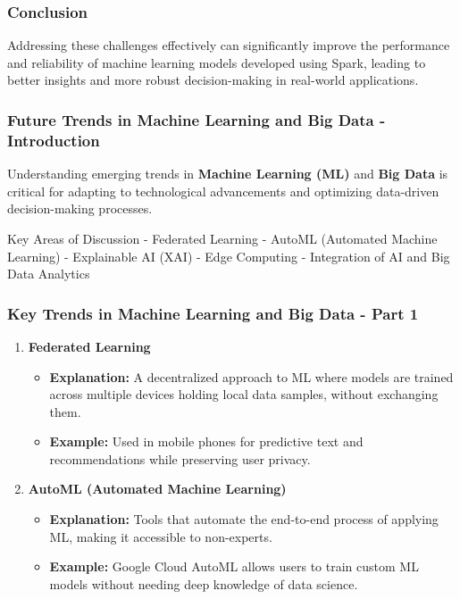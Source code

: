 \documentclass[aspectratio=169]{beamer}
\begin{document}
\begin{frame}[fragile]
    \frametitle{Conclusion}
    Addressing these challenges effectively can significantly improve the performance and reliability of machine learning models developed using Spark, leading to better insights and more robust decision-making in real-world applications.
\end{frame}

\begin{frame}[fragile]
    \frametitle{Future Trends in Machine Learning and Big Data - Introduction}
    Understanding emerging trends in \textbf{Machine Learning (ML)} and \textbf{Big Data} is critical for adapting to technological advancements and optimizing data-driven decision-making processes.
    
    \begin{block}{Key Areas of Discussion}
        - Federated Learning
        - AutoML (Automated Machine Learning)
        - Explainable AI (XAI)
        - Edge Computing
        - Integration of AI and Big Data Analytics
    \end{block}
\end{frame}

\begin{frame}[fragile]
    \frametitle{Key Trends in Machine Learning and Big Data - Part 1}
    \begin{enumerate}
        \item \textbf{Federated Learning}
            \begin{itemize}
                \item \textbf{Explanation:} A decentralized approach to ML where models are trained across multiple devices holding local data samples, without exchanging them.
                \item \textbf{Example:} Used in mobile phones for predictive text and recommendations while preserving user privacy.
            \end{itemize}
        
        \item \textbf{AutoML (Automated Machine Learning)}
            \begin{itemize}
                \item \textbf{Explanation:} Tools that automate the end-to-end process of applying ML, making it accessible to non-experts.
                \item \textbf{Example:} Google Cloud AutoML allows users to train custom ML models without needing deep knowledge of data science.
            \end{itemize}
    \end{enumerate}
\end{frame}
\end{document}
